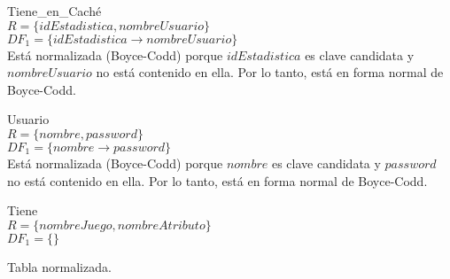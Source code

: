 \item{{\large Tiene\_en\_Caché}}\\
	$R = \{idEstadistica,nombreUsuario\}$\\
	$DF_1 = \{idEstadistica \rightarrow nombreUsuario\}$\\
	
	Está normalizada (Boyce-Codd) porque $idEstadistica$ es clave candidata y $nombreUsuario$ no está contenido en ella. Por lo tanto, está en forma normal de Boyce-Codd.

\item {{\large Usuario}}\\
	$R = \{nombre, password\}$\\
	$DF_1 = \{nombre \rightarrow password\}$\\
	
	Está normalizada (Boyce-Codd) porque $nombre$ es clave candidata y $password$ no está contenido en ella. Por lo tanto, está en forma normal de Boyce-Codd.

\item{{\large Tiene}}\\
	$R = \{nombreJuego, nombreAtributo\}$\\
	$DF_1 = \{\}$

	Tabla normalizada.